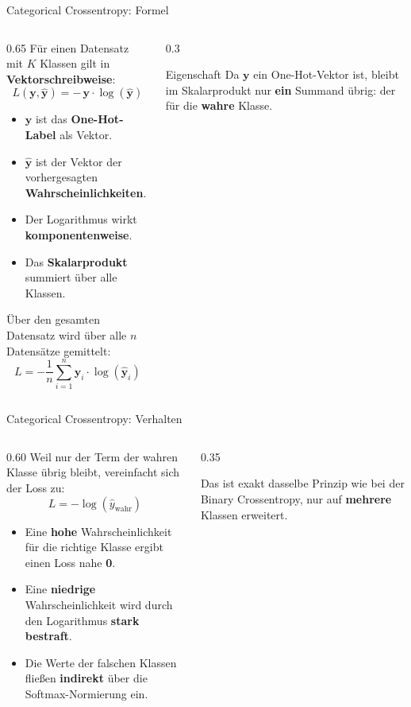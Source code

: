 \begin{frame}{Categorical Crossentropy: Formel}
  \footnotesize
\begin{columns}
\begin{column}{0.65\textwidth}
Für einen Datensatz mit $K$ Klassen gilt in \textbf{Vektorschreibweise}:
\[
L(\mathbf{y}, \hat{\mathbf{y}}) = -\,\mathbf{y} \cdot \log(\hat{\mathbf{y}})
\]
\begin{itemize}
\item $\mathbf{y}$ ist das \textbf{One-Hot-Label} als Vektor.
\item $\hat{\mathbf{y}}$ ist der Vektor der vorhergesagten \textbf{Wahrscheinlichkeiten}.
\item Der Logarithmus wirkt \textbf{komponentenweise}.
\item Das \textbf{Skalarprodukt} summiert über alle Klassen.
\end{itemize}
Über den gesamten Datensatz wird über alle $n$ Datensätze gemittelt:
\[
L = -\frac{1}{n}\sum_{i=1}^{n} \mathbf{y}_i \cdot \log(\hat{\mathbf{y}}_i)
\]
\end{column}
\begin{column}{0.3\textwidth}
\begin{block}{\footnotesize Eigenschaft}
Da $\mathbf{y}$ ein One-Hot-Vektor ist, bleibt im Skalarprodukt nur \textbf{ein} Summand übrig: der für die \textbf{wahre} Klasse.
\end{block}
\end{column}
\end{columns}
\end{frame}

\begin{frame}{Categorical Crossentropy: Verhalten}
\begin{columns}
\begin{column}{0.60\textwidth}
Weil nur der Term der wahren Klasse übrig bleibt, vereinfacht sich der Loss zu:
\[
L = -\log(\hat{y}_{\text{wahr}})
\]
\begin{itemize}
\item Eine \textbf{hohe} Wahrscheinlichkeit für die richtige Klasse ergibt einen Loss nahe \textbf{0}.
\item Eine \textbf{niedrige} Wahrscheinlichkeit wird durch den Logarithmus \textbf{stark bestraft}.
\item Die Werte der falschen Klassen fließen \textbf{indirekt} über die Softmax-Normierung ein.
\end{itemize}
\end{column}

\begin{column}{0.35\textwidth}
 \centering
{}
\par\medskip

Das ist exakt dasselbe Prinzip wie bei der Binary Crossentropy, nur auf \textbf{mehrere} Klassen erweitert.
\end{column}
\end{columns}
\end{frame}

